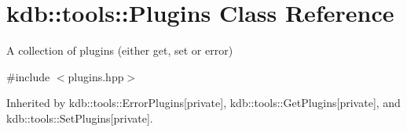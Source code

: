 \hypertarget{classkdb_1_1tools_1_1Plugins}{\section{kdb\+:\+:tools\+:\+:Plugins Class Reference}
\label{classkdb_1_1tools_1_1Plugins}
}


A collection of plugins (either get, set or error)  




{\ttfamily \#include $<$plugins.\+hpp$>$}



Inherited by kdb\+::tools\+::\+Error\+Plugins{\ttfamily  \mbox{[}private\mbox{]}}, kdb\+::tools\+::\+Get\+Plugins{\ttfamily  \mbox{[}private\mbox{]}}, and kdb\+::tools\+::\+Set\+Plugins{\ttfamily  \mbox{[}private\mbox{]}}.

